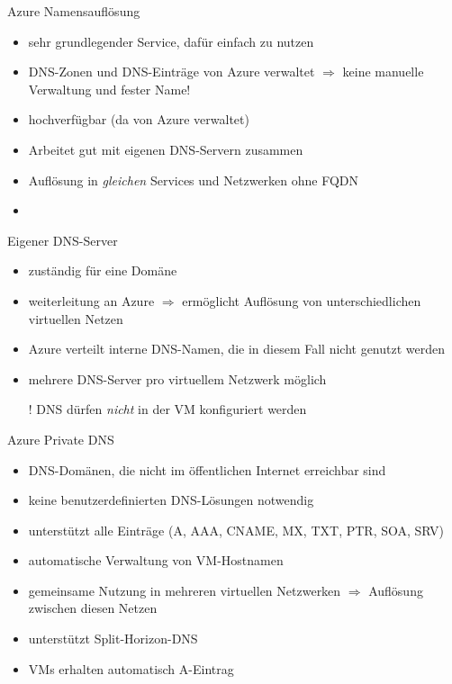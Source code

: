 \begin{flashcard}[]{Azure Namensauflösung}
  \begin{itemize}
    \item sehr grundlegender Service, dafür einfach zu nutzen
    \item DNS-Zonen und DNS-Einträge von Azure verwaltet\newline
      $\Rightarrow$ keine manuelle Verwaltung und fester Name!
    \item hochverfügbar (da von Azure verwaltet)
    \item Arbeitet gut mit eigenen DNS-Servern zusammen
    \item Auflösung in \emph{gleichen} Services und Netzwerken ohne FQDN
    \item
  \end{itemize}
\end{flashcard}

\begin{flashcard}[]{Eigener DNS-Server}
  \begin{itemize}
    \item zuständig für eine Domäne
    \item weiterleitung an Azure\newline
      $\Rightarrow$ ermöglicht Auflösung von unterschiedlichen virtuellen Netzen
    \item Azure verteilt interne DNS-Namen, die in diesem Fall nicht genutzt werden
    \item mehrere DNS-Server pro virtuellem Netzwerk möglich
    \item[!] DNS dürfen \emph{nicht} in der VM konfiguriert werden
  \end{itemize}
\end{flashcard}

\begin{flashcard}[]{Azure Private DNS}
  \begin{itemize}
    \item DNS-Domänen, die nicht im öffentlichen Internet erreichbar sind
    \item keine benutzerdefinierten DNS-Lösungen notwendig
    \item unterstützt alle Einträge (A, AAA, CNAME, MX, TXT, PTR, SOA, SRV)
    \item automatische Verwaltung von VM-Hostnamen
    \item gemeinsame Nutzung in mehreren virtuellen Netzwerken\newline
      $\Rightarrow$ Auflösung zwischen diesen Netzen
    \item unterstützt Split-Horizon-DNS
    \item VMs erhalten automatisch A-Eintrag
  \end{itemize}
\end{flashcard}

